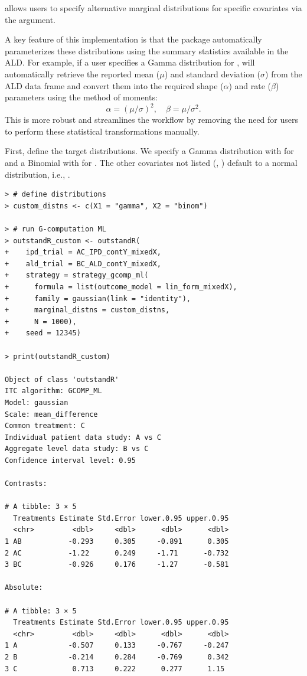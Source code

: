 \documentclass[article]{jss}
\begin{document}
 allows users to specify alternative marginal distributions for specific covariates via the  argument.

A key feature of this implementation is that the package automatically parameterizes these distributions using the summary statistics available in the ALD. For example, if a user specifies a Gamma distribution for ,  will automatically retrieve the reported mean ($\mu$) and standard deviation ($\sigma$) from the ALD data frame and convert them into the required shape ($\alpha$) and rate ($\beta$) parameters using the method of moments:
\begin{equation*}
\alpha = (\mu / \sigma)^2, \quad \beta = \mu / \sigma^2.
\end{equation*}
This is more robust and streamlines the workflow by removing the need for users to perform these statistical transformations manually.

First, define the target distributions. We specify a Gamma distribution with  for  and a Binomial with  for . The other covariates not listed (, ) default to a normal distribution, i.e., .

\begin{verbatim}
> # define distributions
> custom_distns <- c(X1 = "gamma", X2 = "binom")

> # run G-computation ML
> outstandR_custom <- outstandR(
+    ipd_trial = AC_IPD_contY_mixedX,
+    ald_trial = BC_ALD_contY_mixedX,
+    strategy = strategy_gcomp_ml(
+      formula = list(outcome_model = lin_form_mixedX),
+      family = gaussian(link = "identity"),
+      marginal_distns = custom_distns,
+      N = 1000),
+    seed = 12345)

> print(outstandR_custom)

Object of class 'outstandR' 
ITC algorithm: GCOMP_ML 
Model: gaussian 
Scale: mean_difference 
Common treatment: C 
Individual patient data study: A vs C 
Aggregate level data study: B vs C 
Confidence interval level: 0.95 

Contrasts:

# A tibble: 3 × 5
  Treatments Estimate Std.Error lower.0.95 upper.0.95
  <chr>         <dbl>     <dbl>      <dbl>      <dbl>
1 AB           -0.293     0.305     -0.891      0.305
2 AC           -1.22      0.249     -1.71      -0.732
3 BC           -0.926     0.176     -1.27      -0.581

Absolute:

# A tibble: 3 × 5
  Treatments Estimate Std.Error lower.0.95 upper.0.95
  <chr>         <dbl>     <dbl>      <dbl>      <dbl>
1 A            -0.507     0.133     -0.767     -0.247
2 B            -0.214     0.284     -0.769      0.342
3 C             0.713     0.222      0.277      1.15 
\end{verbatim}
\end{document}
